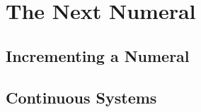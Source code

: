 \documentclass[\main/thesis.tex]{subfiles}
\begin{document}


\section{The Next Numeral}
\subsection{Incrementing a Numeral}
\subsection{Continuous Systems}


%
%
%
\end{document}
